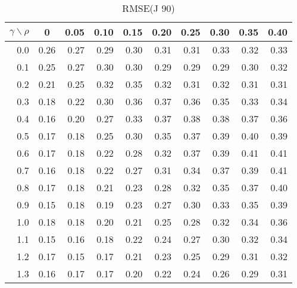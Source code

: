\documentclass[12pt]{article}
\begin{document}
%
\begin{table}[!tbp]
\caption{RMSE(J 90)}
 \begin{center}
 \begin{tabular}{r|rrrrrrrrr}\hline\hline
\multicolumn{1}{c|}{$\gamma\backslash\rho$}&\multicolumn{1}{c}{0}&\multicolumn{1}{c}{0.05}&\multicolumn{1}{c}{0.10}&\multicolumn{1}{c}{0.15}&\multicolumn{1}{c}{0.20}&\multicolumn{1}{c}{0.25}&\multicolumn{1}{c}{0.30}&\multicolumn{1}{c}{0.35}&\multicolumn{1}{c}{0.40}\tabularnewline
\hline
0.0&0.26&0.27&0.29&0.30&0.31&0.31&0.33&0.32&0.33\tabularnewline
0.1&0.25&0.27&0.30&0.30&0.29&0.29&0.29&0.30&0.32\tabularnewline
0.2&0.21&0.25&0.32&0.35&0.32&0.31&0.32&0.31&0.31\tabularnewline
0.3&0.18&0.22&0.30&0.36&0.37&0.36&0.35&0.33&0.34\tabularnewline
0.4&0.16&0.20&0.27&0.33&0.37&0.38&0.38&0.37&0.36\tabularnewline
0.5&0.17&0.18&0.25&0.30&0.35&0.37&0.39&0.40&0.39\tabularnewline
0.6&0.17&0.18&0.22&0.28&0.32&0.37&0.39&0.41&0.41\tabularnewline
0.7&0.16&0.18&0.22&0.27&0.31&0.34&0.37&0.39&0.41\tabularnewline
0.8&0.17&0.18&0.21&0.23&0.28&0.32&0.35&0.37&0.40\tabularnewline
0.9&0.15&0.18&0.19&0.23&0.27&0.30&0.33&0.35&0.39\tabularnewline
1.0&0.18&0.18&0.20&0.21&0.25&0.28&0.32&0.34&0.36\tabularnewline
1.1&0.15&0.16&0.18&0.22&0.24&0.27&0.30&0.32&0.34\tabularnewline
1.2&0.17&0.15&0.17&0.21&0.23&0.25&0.29&0.31&0.32\tabularnewline
1.3&0.16&0.17&0.17&0.20&0.22&0.24&0.26&0.29&0.31\tabularnewline
\hline
\end{tabular}

\end{center}

\end{table}
\end{document}
